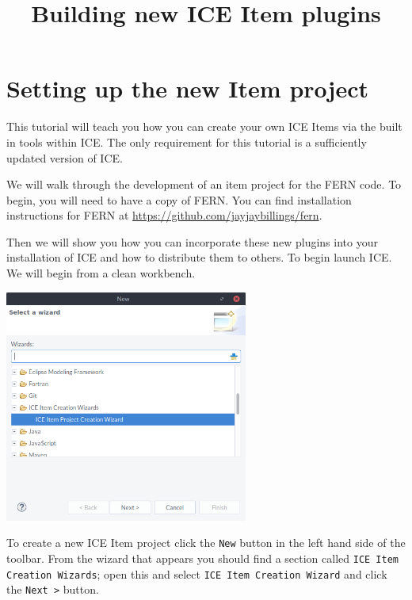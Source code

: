 \documentclass{article} \usepackage{graphicx} \usepackage{hyperref}
\begin{document}
\title{Building new ICE Item plugins}


\section{Setting up the new Item project} 

This tutorial will teach you how you
can create your own ICE Items via the built in tools within ICE.  The only
requirement for this tutorial is a sufficiently updated version of ICE.  

We will walk through the development of an item project for the FERN code.  To
begin, you will need to have a copy of FERN.  You can find installation
instructions for FERN at \url{https://github.com/jayjaybillings/fern}.

Then we will show you how you can incorporate these new plugins into your
installation of ICE and how to distribute them to others.  To begin launch ICE.
We will begin from a clean workbench.

\begin{center} \includegraphics[width=8cm]{images/2} \end{center}

To create a new ICE Item project click the \texttt{New} button in the left hand
side of the toolbar.  From the wizard that appears you should find a section
called \texttt{ICE Item Creation Wizards}; open this and select \texttt{ICE
Item Creation Wizard} and click the \texttt{Next >} button.
\end{document}
